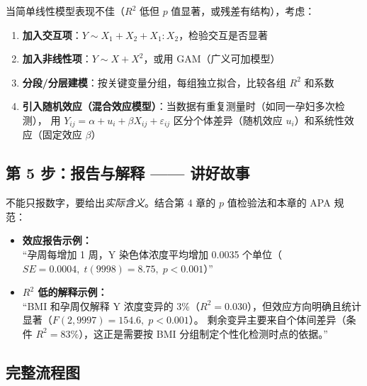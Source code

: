 当简单线性模型表现不佳（$R^2$ 低但 $p$ 值显著，或残差有结构），考虑：

\begin{enumerate}[label=(\arabic*)]
    \item \textbf{加入交互项}：$Y \sim X_1 + X_2 + X_1\!:\!X_2$，检验交互是否显著
    \item \textbf{加入非线性项}：$Y \sim X + X^2$，或用 GAM（广义可加模型）
    \item \textbf{分段/分层建模}：按关键变量分组，每组独立拟合，比较各组 $R^2$ 和系数
    \item \textbf{引入随机效应（混合效应模型）}：当数据有重复测量时（如同一孕妇多次检测），
    用 $Y_{ij} = \alpha + u_i + \beta X_{ij} + \varepsilon_{ij}$ 区分个体差异（随机效应 $u_i$）和系统性效应（固定效应 $\beta$）
\end{enumerate}

\subsection{第 5 步：报告与解释 —— 讲好故事}

不能只报数字，要给出\emph{实际含义}。结合第 4 章的 $p$ 值检验法和本章的 APA 规范：

\begin{itemize}
    \item \textbf{效应报告示例：}\\
    “孕周每增加 1 周，Y 染色体浓度平均增加 0.0035 个单位（$SE = 0.0004,\; t(9998) = 8.75,\; p < 0.001$）”
    \item \textbf{$R^2$ 低的解释示例：}\\
    “BMI 和孕周仅解释 Y 浓度变异的 3\%（$R^2 = 0.030$），但效应方向明确且统计显著（$F(2,9997)=154.6,\; p<0.001$）。
    剩余变异主要来自个体间差异（条件 $R^2 = 83\%$），这正是需要按 BMI 分组制定个性化检测时点的依据。”
\end{itemize}

\subsection{完整流程图}

